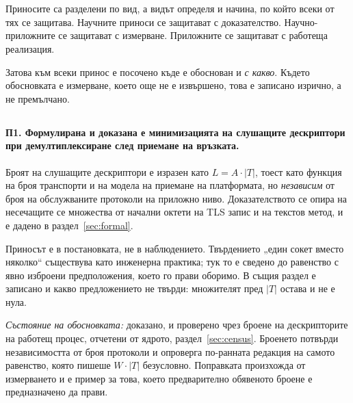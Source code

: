 \clearpage
{}
\section*{}

Приносите са разделени по вид, а видът определя и начина, по който всеки от тях се защитава.
Научните приноси се защитават с доказателство. Научно-приложните се защитават с измерване.
Приложните се защитават с работеща реализация.

Затова към всеки принос е посочено къде е обоснован и \emph{с какво}. Където обосновката е
измерване, което още не е извършено, това е записано изрично, а не премълчано.

\subsection*{}

\paragraph{П1. Формулирана и доказана е минимизацията на слушащите дескриптори при
демултиплексиране след приемане на връзката.}
Броят на слушащите дескриптори е изразен като \(L = A \cdot |T|\), тоест като функция на
броя транспорти и на модела на приемане на платформата, но \emph{независим} от броя на
обслужваните протоколи на приложно ниво. Доказателството се опира на несечащите се множества
от начални октети на TLS запис и на текстов метод, и е дадено в раздел~\ref{sec:formal}.

Приносът е в постановката, не в наблюдението. Твърдението „един сокет вместо няколко“
съществува като инженерна практика; тук то е сведено до равенство с явно изброени
предположения, което го прави оборимо. В същия раздел е записано и какво предложението не
твърди: множителят пред \(|T|\) остава и не е нула.

\emph{Състояние на обосновката:} доказано, и проверено чрез броене на дескрипторите на
работещ процес, отчетени от ядрото, раздел~\ref{sec:census}. Броенето потвърди независимостта
от броя протоколи и опроверга по-ранната редакция на самото равенство, която пишеше
\(W \cdot |T|\) безусловно. Поправката произхожда от измерването и е пример за това, което
предварително обявеното броене е предназначено да прави.

